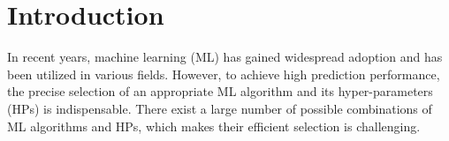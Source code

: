 
\section{Introduction}
\label{sec:introduction}



In recent years, machine learning (ML) has gained widespread adoption and has been utilized in various fields.
%
However, to achieve high prediction performance, the precise selection of an appropriate ML algorithm and its hyper-parameters (HPs) is indispensable.
%
There exist a large number of possible combinations of ML algorithms and HPs, which makes their efficient selection is challenging.



